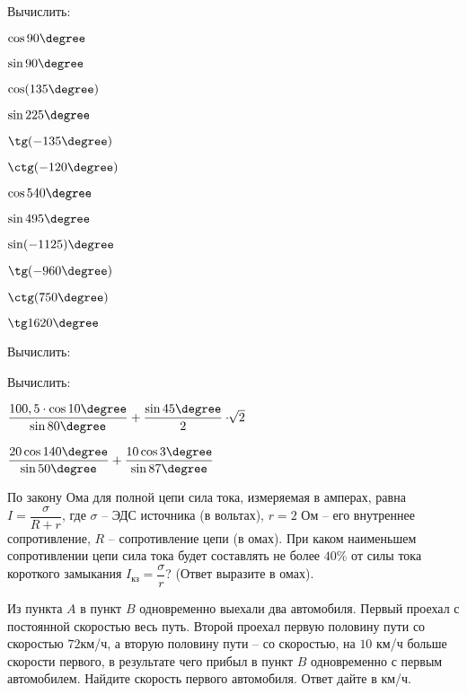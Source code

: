 \begin{homework}[number=1]
	\begin{listofex}
		\item Вычислить:
		\begin{enumcols}[itemcolumns=4]
			\item \( \cos90\degree \)
			\item \( \sin90\degree \)
			\item \( \cos(135\degree )\)
			\item \( \sin225\degree \)
			\item \( \tg(-135\degree) \)
			\item \( \ctg(-120\degree) \)
			\item \( \cos540\degree \)
			\item \( \sin495\degree \)
			\item \( \sin(-1125)\degree \)
			\item \( \tg(-960\degree) \)
			\item \( \ctg(750\degree) \)
			\item \( \tg1620\degree \)
		\end{enumcols}
		\item Вычислить:
		\begin{enumcols}[itemcolumns=3]
			\item {}
			\item {}
			\item {}
			\item {}
			\item {}
			\item {}
		\end{enumcols}
		\item Вычислить:
		\begin{enumcols}[itemcolumns=2]
			\item \( \dfrac{100,5\cdot\cos 10\degree}{\sin 80\degree}+\dfrac{\sin 45\degree}{2}\cdot\sqrt[]{2} \)
			\item \( \dfrac{20\cos140\degree}{\sin 50\degree}+\dfrac{10\cos 3\degree}{\sin 87\degree} \)
		\end{enumcols}
		\item По закону Ома для полной цепи сила тока, измеряемая в амперах, равна \( I=\dfrac{\sigma}{R+r} \), где \(\sigma\) – ЭДС источника (в вольтах), \(r=2\) Ом – его внутреннее сопротивление, \(R\) – сопротивление цепи (в омах). При каком наименьшем сопротивлении цепи сила тока будет составлять не более \(40\% \) от силы тока короткого замыкания \( I_{кз} =\dfrac{\sigma}{r}\)? (Ответ выразите в омах).
		\item Из пункта \( A \) в пункт \( B \) одновременно выехали два автомобиля. Первый проехал с постоянной скоростью весь путь. Второй проехал первую половину пути со скоростью \( 72 \)км/ч, а вторую половину пути – со скоростью, на \(10\) км/ч больше скорости первого, в результате чего прибыл в пункт \( B \) одновременно с первым автомобилем. Найдите скорость первого автомобиля. Ответ дайте в км/ч.
	\end{listofex}
\end{homework}

